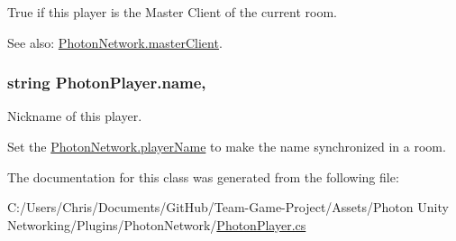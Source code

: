 True if this player is the Master Client of the current room. 

See also\+: \hyperlink{class_photon_network_aa7e51b5e5f9f8b89f057096f47d11c5b}{Photon\+Network.\+master\+Client}. 
\subsubsection[{\texorpdfstring{name}{name}}]{\setlength{\rightskip}{0pt plus 5cm}string Photon\+Player.\+name\hspace{0.3cm}{\ttfamily [get]}, {\ttfamily [set]}}\hypertarget{class_photon_player_a74e5bb916dbfdb6960b8f2f11fa6aba9}{}\label{class_photon_player_a74e5bb916dbfdb6960b8f2f11fa6aba9}


Nickname of this player. 

Set the \hyperlink{class_photon_network_abb168e543c15731ec4de869d3a1ad8f4}{Photon\+Network.\+player\+Name} to make the name synchronized in a room.

The documentation for this class was generated from the following file\+:\begin{DoxyCompactItemize}
\item 
C\+:/\+Users/\+Chris/\+Documents/\+Git\+Hub/\+Team-\/\+Game-\/\+Project/\+Assets/\+Photon Unity Networking/\+Plugins/\+Photon\+Network/\hyperlink{_photon_player_8cs}{Photon\+Player.\+cs}\end{DoxyCompactItemize}
